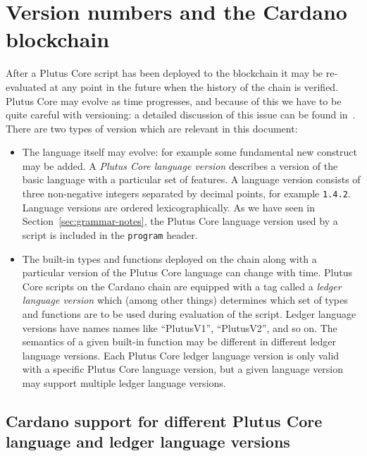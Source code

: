 \section{Version numbers and the Cardano blockchain}
\label{appendix:version-numbers}
After a Plutus Core script has been deployed to the blockchain it may be
re-evaluated at any point in the future when the history of the chain is
verified.  Plutus Core may evolve as time progresses, and because of this we
have to be quite careful with versioning: a detailed discussion of this issue
can be found in~\cite{CIP-35}.  There are two types of version which are
relevant in this document:

\begin{itemize}
\item The language itself may evolve: for example some fundamental new construct
  may be added.  A \textit{Plutus Core language version} describes a version of
  the basic language with a particular set of features. A language version
  consists of three non-negative integers separated by decimal points, for
  example \texttt{1.4.2}.  Language versions are ordered lexicographically.  As
  we have seen in Section~\ref{sec:grammar-notes}, the Plutus Core
  language version used by a script is included in the \texttt{program} header.
  
\item The built-in types and functions deployed on the chain along with a
  particular version of the Plutus Core language can change with time.  Plutus
  Core scripts on the Cardano chain are equipped with a tag called a
  \textit{ledger language version} which (among other things) determines which
  set of types and functions are to be used during evaluation of the script.
  Ledger language versions have names names like ``PlutusV1'', ``PlutusV2'',
  and so on.  The semantics of a given built-in function may be different in
  different ledger language versions.  Each Plutus Core ledger language version
  is only valid with a specific Plutus Core language version, but a given
  language version may support multiple ledger language versions.
\end{itemize}

\subsection{Cardano support for different Plutus Core language and ledger language versions}

